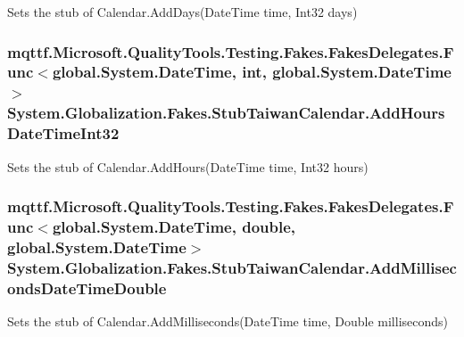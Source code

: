 Sets the stub of Calendar.\-Add\-Days(\-Date\-Time time, Int32 days)

\hypertarget{class_system_1_1_globalization_1_1_fakes_1_1_stub_taiwan_calendar_a59aefb8220706cb64506577fa841facd}{
\subsubsection[{Add\-Hours\-Date\-Time\-Int32}]{\setlength{\rightskip}{0pt plus 5cm}mqttf.\-Microsoft.\-Quality\-Tools.\-Testing.\-Fakes.\-Fakes\-Delegates.\-Func$<$global.\-System.\-Date\-Time, int, global.\-System.\-Date\-Time$>$ System.\-Globalization.\-Fakes.\-Stub\-Taiwan\-Calendar.\-Add\-Hours\-Date\-Time\-Int32}}\label{class_system_1_1_globalization_1_1_fakes_1_1_stub_taiwan_calendar_a59aefb8220706cb64506577fa841facd}


Sets the stub of Calendar.\-Add\-Hours(\-Date\-Time time, Int32 hours)

\hypertarget{class_system_1_1_globalization_1_1_fakes_1_1_stub_taiwan_calendar_aaed61ff61b02968f184f2e40fb9e78d7}{
\subsubsection[{Add\-Milliseconds\-Date\-Time\-Double}]{\setlength{\rightskip}{0pt plus 5cm}mqttf.\-Microsoft.\-Quality\-Tools.\-Testing.\-Fakes.\-Fakes\-Delegates.\-Func$<$global.\-System.\-Date\-Time, double, global.\-System.\-Date\-Time$>$ System.\-Globalization.\-Fakes.\-Stub\-Taiwan\-Calendar.\-Add\-Milliseconds\-Date\-Time\-Double}}\label{class_system_1_1_globalization_1_1_fakes_1_1_stub_taiwan_calendar_aaed61ff61b02968f184f2e40fb9e78d7}


Sets the stub of Calendar.\-Add\-Milliseconds(\-Date\-Time time, Double milliseconds)

